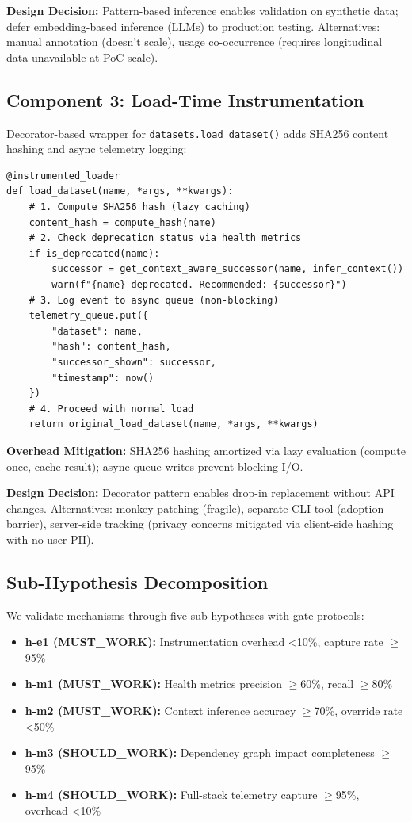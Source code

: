 \textbf{Design Decision:} Pattern-based inference enables validation on synthetic data; defer embedding-based inference (LLMs) to production testing. Alternatives: manual annotation (doesn't scale), usage co-occurrence (requires longitudinal data unavailable at PoC scale).

\subsection{Component 3: Load-Time Instrumentation}

Decorator-based wrapper for \texttt{datasets.load\_dataset()} adds SHA256 content hashing and async telemetry logging:

\begin{verbatim}
@instrumented_loader
def load_dataset(name, *args, **kwargs):
    # 1. Compute SHA256 hash (lazy caching)
    content_hash = compute_hash(name)
    # 2. Check deprecation status via health metrics
    if is_deprecated(name):
        successor = get_context_aware_successor(name, infer_context())
        warn(f"{name} deprecated. Recommended: {successor}")
    # 3. Log event to async queue (non-blocking)
    telemetry_queue.put({
        "dataset": name,
        "hash": content_hash,
        "successor_shown": successor,
        "timestamp": now()
    })
    # 4. Proceed with normal load
    return original_load_dataset(name, *args, **kwargs)
\end{verbatim}

\textbf{Overhead Mitigation:} SHA256 hashing amortized via lazy evaluation (compute once, cache result); async queue writes prevent blocking I/O.

\textbf{Design Decision:} Decorator pattern enables drop-in replacement without API changes. Alternatives: monkey-patching (fragile), separate CLI tool (adoption barrier), server-side tracking (privacy concerns mitigated via client-side hashing with no user PII).

\subsection{Sub-Hypothesis Decomposition}

We validate mechanisms through five sub-hypotheses with gate protocols:

\begin{itemize}
\item \textbf{h-e1 (MUST\_WORK):} Instrumentation overhead <10\%, capture rate $\geq$95\%
\item \textbf{h-m1 (MUST\_WORK):} Health metrics precision $\geq$60\%, recall $\geq$80\%
\item \textbf{h-m2 (MUST\_WORK):} Context inference accuracy $\geq$70\%, override rate <50\%
\item \textbf{h-m3 (SHOULD\_WORK):} Dependency graph impact completeness $\geq$95\%
\item \textbf{h-m4 (SHOULD\_WORK):} Full-stack telemetry capture $\geq$95\%, overhead <10\%
\end{itemize}

